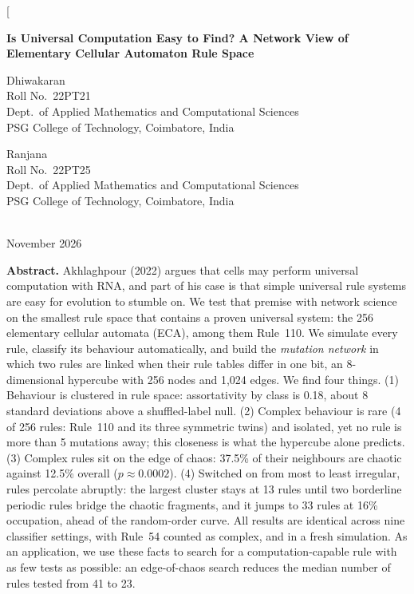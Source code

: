 \documentclass[10pt,letterpaper,twocolumn]{article}
\begin{document}
\twocolumn[{%
\begin{center}
{\Large\bfseries Is Universal Computation Easy to Find? A Network View of\\[2pt] Elementary Cellular Automaton Rule Space\par}
\vspace{10pt}
\begin{minipage}[t]{0.45\textwidth}\centering
Dhiwakaran\footnotemark\\[1pt]
{\small Roll No.\ 22PT21}\\
{\small Dept.\ of Applied Mathematics and Computational Sciences}\\
{\small PSG College of Technology, Coimbatore, India}
\end{minipage}\hfill
\begin{minipage}[t]{0.45\textwidth}\centering
Ranjana\\[1pt]
{\small Roll No.\ 22PT25}\\
{\small Dept.\ of Applied Mathematics and Computational Sciences}\\
{\small PSG College of Technology, Coimbatore, India}
\end{minipage}\\[8pt]
November 2026\\[12pt]
\begin{minipage}{0.92\textwidth}
\small
\textbf{Abstract.} Akhlaghpour (2022) argues that cells may perform universal computation with RNA, and part of his case is that simple universal rule systems are easy for evolution to stumble on. We test that premise with network science on the smallest rule space that contains a proven universal system: the 256 elementary cellular automata (ECA), among them Rule~110. We simulate every rule, classify its behaviour automatically, and build the \emph{mutation network} in which two rules are linked when their rule tables differ in one bit, an 8-dimensional hypercube with 256 nodes and 1{,}024 edges. We find four things. (1) Behaviour is clustered in rule space: assortativity by class is 0.18, about 8 standard deviations above a shuffled-label null. (2) Complex behaviour is rare (4 of 256 rules: Rule~110 and its three symmetric twins) and isolated, yet no rule is more than 5 mutations away; this closeness is what the hypercube alone predicts. (3) Complex rules sit on the edge of chaos: 37.5\% of their neighbours are chaotic against 12.5\% overall ($p \approx 0.0002$). (4) Switched on from most to least irregular, rules percolate abruptly: the largest cluster stays at 13 rules until two borderline periodic rules bridge the chaotic fragments, and it jumps to 33 rules at 16\% occupation, ahead of the random-order curve. All results are identical across nine classifier settings, with Rule~54 counted as complex, and in a fresh simulation. As an application, we use these facts to search for a computation-capable rule with as few tests as possible: an edge-of-chaos search reduces the median number of rules tested from 41 to 23.\\[4pt]

\end{minipage}
\end{center}}
\end{document}
